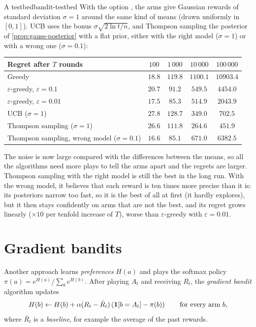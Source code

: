 \begin{remark}{A testbed}{bandit-testbed}
  With the option , the arms give Gaussian rewards of
  standard deviation $\sigma = 1$ around the same kind of means (drawn
  uniformly in $[0, 1]$). UCB uses the bonus $\sigma \sqrt{2 \ln t / n}$,
  and Thompson sampling the posterior of \cref{prop:gauss-posterior} with a
  flat prior, either with the right model ($\sigma = 1$) or with a wrong
  one ($\sigma = 0.1$):
  \begin{center}
    \begin{tabular}{@{}lcccc@{}}
      \toprule
      Regret after $T$ rounds & $100$ & $1\,000$ & $10\,000$ &
        $100\,000$ \\
      \midrule
      Greedy & $18.8$ & $119.8$ & $1100.1$ & $10903.4$ \\
      $\varepsilon$-greedy, $\varepsilon = 0.1$ & $20.7$ & $91.2$ & $549.5$ &
        $4454.0$ \\
      $\varepsilon$-greedy, $\varepsilon = 0.01$ & $17.5$ & $85.3$ & $514.9$ &
        $2043.9$ \\
      UCB ($\sigma = 1$) & $27.8$ & $128.7$ & $349.0$ & $702.5$ \\
      Thompson sampling ($\sigma = 1$) & $26.6$ & $111.8$ & $264.6$ &
        $451.9$ \\
      Thompson sampling, wrong model ($\sigma = 0.1$) & $16.6$ & $85.1$ &
        $671.0$ & $6382.5$ \\
      \bottomrule
    \end{tabular}
  \end{center}
  The noise is now large compared with the differences between the means,
  so all the algorithms need more plays to tell the arms apart and the
  regrets are larger. Thompson sampling with the right model is still the
  best in the long run. With the wrong model, it believes that each reward
  is ten times more precise than it is: its posteriors narrow too fast, so
  it is the best of all at first (it hardly explores), but it then stays
  confidently on arms that are not the best, and its regret grows linearly
  ($\times 10$ per tenfold increase of $T$), worse than $\varepsilon$-greedy
  with $\varepsilon = 0.01$.
\end{remark}

\section{Gradient bandits}

Another approach learns \emph{preferences} $H(a)$ and plays the softmax
policy $\pi(a) = e^{H(a)} / \sum_b e^{H(b)}$. After playing $A_t$ and
receiving $R_t$, the \emph{gradient bandit} algorithm updates
\begin{equation}
  \label{eq:gradient-bandit}
  H(b) \gets H(b) + \alpha (R_t - \bar R_t) \left( \mathbf{1}[b = A_t] -
  \pi(b) \right) \qquad \text{for every arm } b,
\end{equation}
where $\bar R_t$ is a \emph{baseline}, for example the average of the past
rewards.

